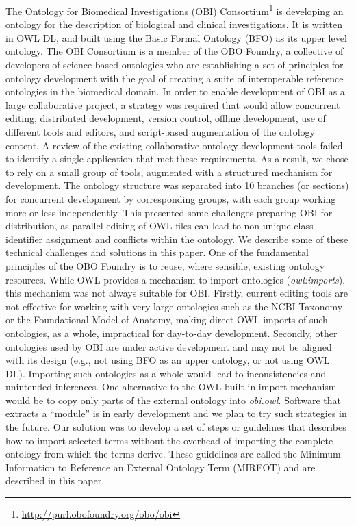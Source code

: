 \documentclass{elsart}       %
\begin{document}
The Ontology for Biomedical Investigations (OBI) Consortium\footnote{\url{http://purl.obofoundry.org/obo/obi}} is developing an ontology for the description of biological and clinical investigations.
It is written in OWL DL, and built using the Basic Formal Ontology (BFO)\cite{bfo} as its upper level ontology.
The OBI Consortium is a member of the OBO Foundry\cite{foundry}, a collective of developers of science-based ontologies who are establishing a set of principles for ontology development with the goal of creating a suite of interoperable reference ontologies in the biomedical domain. 
In order to enable development of OBI as a large collaborative project, a strategy was required that would allow concurrent editing, distributed development, version control, offline development, use of different tools and editors, and script-based augmentation of the ontology content.
A review of the existing collaborative ontology development tools failed to identify a single application that met these requirements.
As a result, we chose to rely on a small group of tools, augmented with a structured mechanism for development.
The ontology structure was separated into 10 branches (or sections) for concurrent development by corresponding groups, with each group working more or less independently.
This presented some challenges preparing OBI for distribution, as parallel editing of OWL files can lead to non-unique class identifier assignment and conflicts within the ontology. We describe some of these technical challenges and solutions in this paper.
One of the fundamental principles of the OBO Foundry is to reuse, where sensible, existing ontology resources.
While OWL provides a mechanism to import ontologies (\emph{owl:imports}), this mechanism was not always suitable for OBI. Firstly, current editing tools are not effective for working with very large ontologies such as the NCBI Taxonomy\cite{ncbi} or the Foundational Model of Anatomy\cite{fma}, making direct OWL imports of such ontologies, as a whole, impractical for day-to-day development. Secondly, other ontologies used by OBI are under active development and may not be aligned with its design (e.g., not using BFO as an upper ontology, or not using OWL DL). Importing such ontologies as a whole would lead to inconsistencies and unintended inferences. 
One alternative to the OWL built-in import mechanism would be to copy only parts of the external ontology into \emph{obi.owl}. Software that extracts a ``module''\cite{module} is in early development and we plan to try such strategies in the future. 
Our solution was to develop a set of steps or guidelines that describes how to import selected terms without the overhead of importing the complete ontology from which the terms derive.
These guidelines are called the Minimum Information to Reference an External Ontology Term (MIREOT) and are described in this paper.
\end{document}
